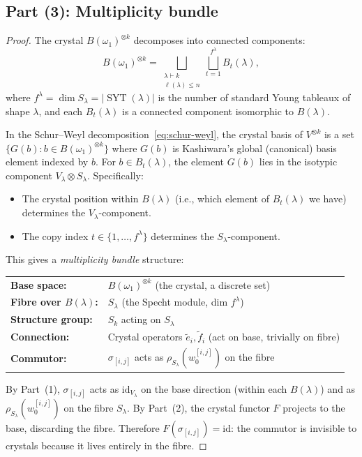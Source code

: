 \documentclass[11pt]{article}
\theoremstyle{remark}
\newcommand{\id}{\mathrm{id}}
\DeclareMathOperator{\SYT}{SYT}
\begin{document}
\subsection{Part (3): Multiplicity bundle}

\begin{proof}
The crystal $B(\omega_1)^{\otimes k}$ decomposes into connected
components:
\[
  B(\omega_1)^{\otimes k} = \bigsqcup_{\substack{\lambda \vdash k \\
  \ell(\lambda) \leq n}} \bigsqcup_{t=1}^{f^\lambda} B_t(\lambda),
\]
where $f^\lambda = \dim S_\lambda = |\SYT(\lambda)|$ is the number of
standard Young tableaux of shape $\lambda$, and each $B_t(\lambda)$
is a connected component isomorphic to $B(\lambda)$.

In the Schur--Weyl decomposition~\eqref{eq:schur-weyl}, the crystal
basis of $V^{\otimes k}$ is a set $\{G(b) : b \in B(\omega_1)^{\otimes k}\}$
where $G(b)$ is Kashiwara's global (canonical) basis element indexed
by $b$. For $b \in B_t(\lambda)$, the element $G(b)$ lies in the
isotypic component $V_\lambda \otimes S_\lambda$. Specifically:
\begin{itemize}
  \item The crystal position within $B(\lambda)$ (i.e., which element
    of $B_t(\lambda)$ we have) determines the $V_\lambda$-component.
  \item The copy index $t \in \{1, \ldots, f^\lambda\}$ determines the
    $S_\lambda$-component.
\end{itemize}

This gives a \emph{multiplicity bundle} structure:
\begin{center}
\begin{tabular}{ll}
  \textbf{Base space:} & $B(\omega_1)^{\otimes k}$ (the crystal, a discrete set) \\
  \textbf{Fibre over $B(\lambda)$:} & $S_\lambda$ (the Specht module, dim $f^\lambda$) \\
  \textbf{Structure group:} & $S_k$ acting on $S_\lambda$ \\
  \textbf{Connection:} & Crystal operators $\tilde{e}_i, \tilde{f}_i$ (act on base, trivially on fibre) \\
  \textbf{Commutor:} & $\sigma_{[i,j]}$ acts as $\rho_{S_\lambda}(w_0^{[i,j]})$ on the fibre
\end{tabular}
\end{center}

By Part~(1), $\sigma_{[i,j]}$ acts as $\id_{V_\lambda}$ on the base
direction (within each $B(\lambda)$) and as
$\rho_{S_\lambda}(w_0^{[i,j]})$ on the fibre $S_\lambda$.
By Part~(2), the crystal functor $F$ projects to the base, discarding
the fibre. Therefore $F(\sigma_{[i,j]}) = \id$: the commutor is
invisible to crystals because it lives entirely in the fibre.
\end{proof}
\end{document}
